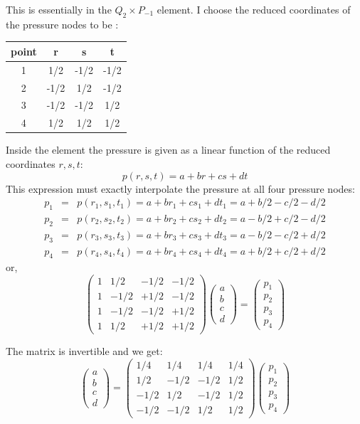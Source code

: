 This is essentially in the $Q_2\times P_{-1}$ element. 
I choose the reduced coordinates of the pressure nodes to be :

\begin{tabular}{cccc}
\hline
point & r & s & t \\
\hline
1& 1/2 &-1/2 &-1/2\\
2& -1/2 &1/2 &-1/2\\
3& -1/2 &-1/2& 1/2\\
4& 1/2 &1/2& 1/2 \\
\hline
\end{tabular}

Inside the element the pressure is given as a linear function of the reduced coordinates $r,s,t$:
\[
p(r,s,t)=a+br+cs+dt
\]
This expression must exactly interpolate the pressure at all four pressure nodes:
\begin{eqnarray}
p_1 
&=& p(r_1,s_1,t_1) 
= a+br_1+cs_1+dt_1 
= a+b/2-c/2-d/2\nonumber\\
p_2
&=& p(r_2,s_2,t_2)
= a+br_2+cs_2+dt_2
= a-b/2+c/2-d/2\nonumber\\
p_3
&=& p(r_3,s_3,t_3) 
= a+br_3+cs_3+dt_3 
= a-b/2-c/2+d/2\nonumber\\
p_4
&=& p(r_4,s_4,t_4) 
= a+br_4+cs_4+dt_4
= a+b/2+c/2+d/2\nonumber
\end{eqnarray}
or,
\begin{equation}
\left(
\begin{array}{cccc}
1 & 1/2 & -1/2 & -1/2 \\
1 & -1/2 & +1/2 & -1/2 \\
1 & -1/2 & -1/2 & +1/2 \\
1 & 1/2 & +1/2 & +1/2 
\end{array}
\right)
\left(
\begin{array}{c}
a\\b\\c\\d
\end{array}
\right)=
\left(
\begin{array}{c}
p_1\\p_2\\p_3\\p_4
\end{array}
\right)
\nonumber
\end{equation}

The matrix is invertible and we get:
\[
\left(
\begin{array}{c}
a\\b\\c\\d
\end{array}
\right)=
\left(
\begin{array}{cccc}
1/4 & 1/4 & 1/4 & 1/4 \\
1/2 & -1/2 & -1/2 & 1/2 \\
-1/2 & 1/2 & -1/2 & 1/2 \\
-1/2 & -1/2 & 1/2 & 1/2
\end{array}
\right)
\left(
\begin{array}{c}
p_1\\p_2\\p_3\\p_4
\end{array}
\right)
\]

